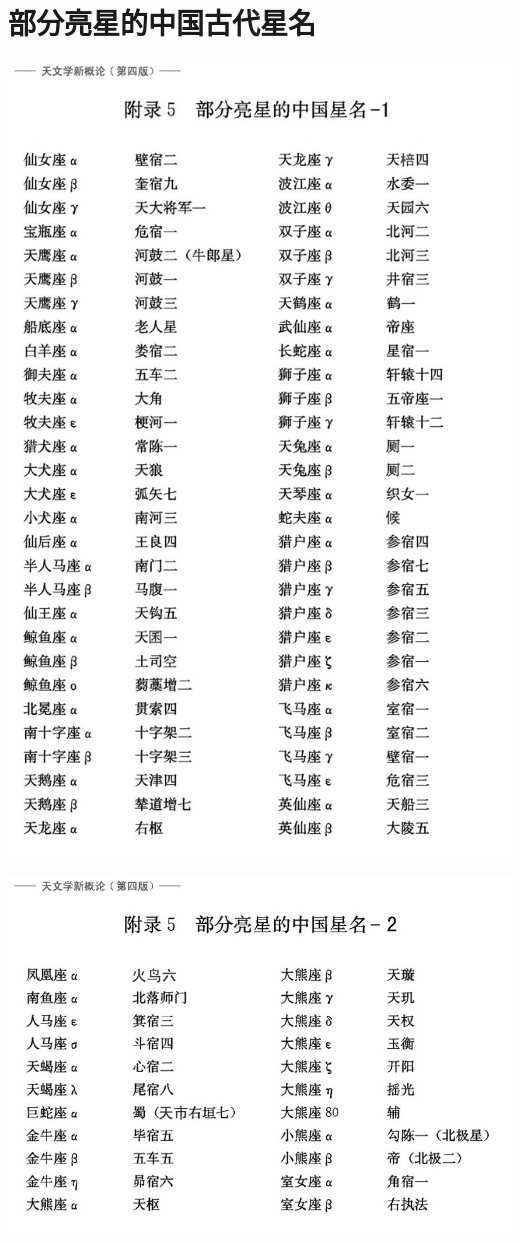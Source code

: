 \section{部分亮星的中国古代星名}
	\includegraphics[scale=0.5]{ancient_1.jpg}
	
	\includegraphics[scale=0.55]{ancient_2.jpg}
